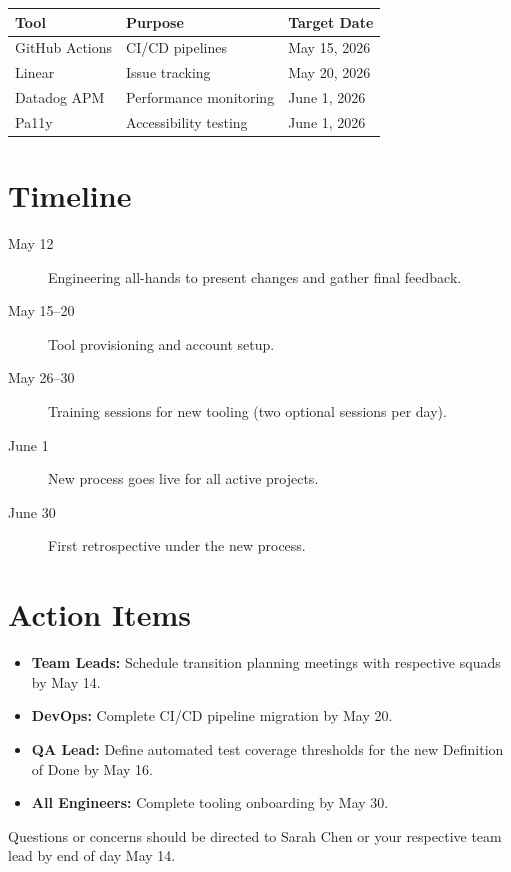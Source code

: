 \documentclass[
    language=english,
    doctype=memo,
    institution=none,
]{../../omnilatex}
\begin{document}
\begin{table}[h]
    \centering
    \begin{tabular}{lll}
        \toprule
        \textbf{Tool} & \textbf{Purpose} & \textbf{Target Date} \\
        \midrule
        GitHub Actions   & CI/CD pipelines      & May 15, 2026 \\
        Linear           & Issue tracking       & May 20, 2026 \\
        Datadog APM      & Performance monitoring & June 1, 2026 \\
        Pa11y            & Accessibility testing  & June 1, 2026 \\
        \bottomrule
    \end{tabular}
\end{table}

\section{Timeline}

\begin{description}
    \item[May 12] Engineering all-hands to present changes and gather final
        feedback.
    \item[May 15--20] Tool provisioning and account setup.
    \item[May 26--30] Training sessions for new tooling (two optional sessions
        per day).
    \item[June 1] New process goes live for all active projects.
    \item[June 30] First retrospective under the new process.
\end{description}

\section{Action Items}

\begin{itemize}
    \item \textbf{Team Leads:} Schedule transition planning meetings with
        respective squads by May 14.
    \item \textbf{DevOps:} Complete CI/CD pipeline migration by May 20.
    \item \textbf{QA Lead:} Define automated test coverage thresholds for the
        new Definition of Done by May 16.
    \item \textbf{All Engineers:} Complete tooling onboarding by May 30.
\end{itemize}

Questions or concerns should be directed to Sarah Chen or your respective team
lead by end of day May 14.
\end{document}
